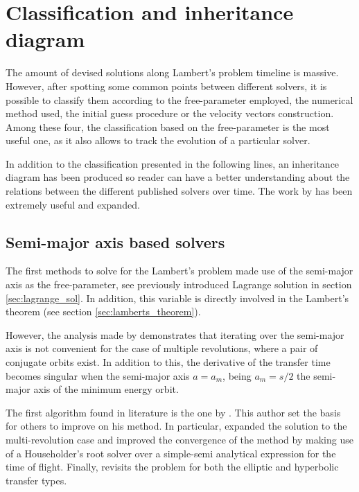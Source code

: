 \section{Classification and inheritance diagram}

The amount of devised solutions along Lambert's problem timeline is massive.
However, after spotting some common points between different solvers, it is
possible to classify them according to the free-parameter employed, the
numerical method used, the initial guess procedure or the velocity vectors
construction. Among these four, the classification based on the free-parameter
is the most useful one, as it also allows to track the evolution of a particular
solver. 

In addition to the classification presented in the following lines, an
inheritance diagram has been produced so reader can have a better understanding
about the relations between the different published solvers over time. The work
by \cite{sangra2020} has been extremely useful and expanded.

\subsection{Semi-major axis based solvers}

The first methods to solve for the Lambert's problem made use of the semi-major
axis as the free-parameter, see previously introduced Lagrange solution in
section \ref{sec:lagrange_sol}. In addition, this variable is directly involved
in the Lambert's theorem (see section \ref{sec:lamberts_theorem}).

However, the analysis made by \cite{battin1999} demonstrates that iterating over
the semi-major axis is not convenient for the case of multiple revolutions,
where a pair of conjugate orbits exist. In addition to this, the derivative of
the transfer time becomes singular when the semi-major axis $a = a_m$, being
$a_m = s / 2$ the semi-major axis of the minimum energy orbit.

The first algorithm found in literature is the one by \cite{lagrange1788}. This
author set the basis for others to improve on his method. In particular,
\cite{prussing2000} expanded the solution to the multi-revolution case and
\cite{wailliez2014} improved the convergence of the method by making use of a
Householder's root solver over a simple-semi analytical expression for the time
of flight. Finally, \cite{jiang2016} revisits the problem for both the elliptic
and hyperbolic transfer types.

